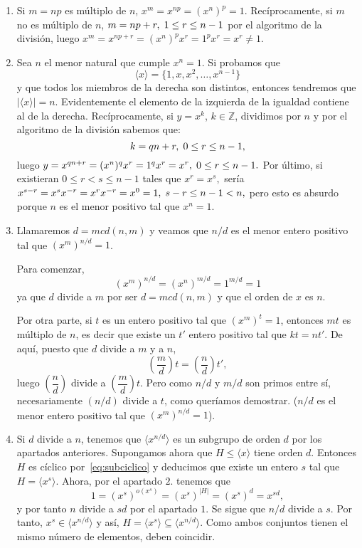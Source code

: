 \documentclass[12pt]{article}
\begin{document}
\begin{enumerate}
\item Si $m = np$ es múltiplo de $n$, $x^{m} = x^{np} = (x^{n})^{p} = 1.$ Recíprocamente, si $m$ no es múltiplo de $n$, $m = np + r, \hspace{0.1cm} 1\leq r\leq n-1$ por el algoritmo de la división, luego $x^{m} = x^{np + r} = (x^{n})^{p}x^{r} = 1^{p}x^{r} = x^{r} \neq 1$.
\item Sea $n$ el menor natural que cumple $x^{n} = 1$. Si probamos que $$\langle x \rangle = \lbrace 1, x,x^2, \ldots, x^{n-1} \rbrace$$ y que todos los miembros de la derecha son distintos, entonces tendremos que $| \langle x\rangle | = n$.
Evidentemente el elemento de la izquierda de la igualdad contiene al de la derecha. Recíprocamente, si $y = x^{k}$, $k \in \mathbb{Z}$, dividimos por $n$ y por el algoritmo de la división sabemos que: $$k = qn + r, \hspace{0.1cm} 0\leq r \leq n-1,$$ luego $y = x^{qn+r}= (x^{n})^{q}x^{r} = 1^{q}x^{r} = x^{r}, \hspace{0.1cm}  0\leq r \leq n-1.$ Por último, si existieran $0\leq r < s \leq n-1$ tales que $x^{r} = x^{s},$ sería $x^{s-r} = x^{s}x^{-r} = x^{r}x^{-r} = x^{0} = 1, \hspace{0.1cm} s-r \leq n-1 < n,$ pero esto es absurdo porque $n$ es el menor positivo tal que $x^{n} = 1$.
\item Llamaremos $d = mcd(n,m)$ y veamos que $n/d$ es el menor entero positivo tal que $(x^{m})^{n/d} = 1$.

Para comenzar, $$(x^{m})^{n/d} = (x^{n})^{m/d} = 1^{m/d} = 1$$ ya que $d$ divide a $m$ por ser $d = mcd(n,m)$ y que el orden de $x$ es $n$.

Por otra parte, si $t$ es un entero positivo tal que $(x^{m})^{t} = 1$, entonces $mt$ es múltiplo de $n$, es decir que existe un $t'$ entero positivo tal que $kt = nt'$. De aquí, puesto que $d$ divide a $m$  y a $n$, $$\left( \dfrac{m}{d}\right)t =\left( \dfrac{n}{d}\right) t',$$ luego $\left( \dfrac{n}{d}\right) $ divide a $\left( \dfrac{m}{d}\right) t$. Pero como $n/d$ y $m/d$ son primos entre sí, necesariamente $(n/d)$ divide a $t$, como queríamos demostrar. ($n/d$ es el menor entero positivo tal que $(x^{m})^{n/d} = 1$).
\item Si $d$ divide a $n$, tenemos que $\langle x^{n/d} \rangle$ es un subgrupo de orden $d$ por los apartados anteriores. Supongamos ahora que $H \leq \langle x \rangle $ tiene orden $d$. Entonces $H$ es cíclico por~\ref{eq:subciclico} y deducimos que existe un entero $s$ tal que $H = \langle x^s \rangle$. Ahora, por el apartado $2.$ tenemos que $$1 = (x^s)^{o(x^s)} = (x^s)^{|H|} = (x^s)^d = x^{sd},$$ y por tanto $n$ divide a $sd$ por el apartado $1.$ Se sigue que $n/d$ divide a $s$. Por tanto, $x^s \in \langle x^{n/d} \rangle$ y así, $H = \langle x^s \rangle \subseteq \langle x^{n/d} \rangle$. Como ambos conjuntos tienen el mismo número de elementos, deben coincidir.
\end{enumerate}
\end{document}

